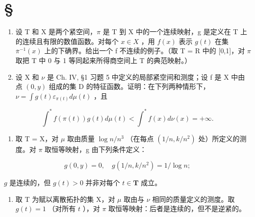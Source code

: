 \section*{\texorpdfstring{\S\CurrentExerciseGroup}{第{\CurrentExerciseGroup}节}}
{}

\begin{enumerate}
\def\labelenumi{\arabic{enumi})}
\item
  设 T 和 X 是两个紧空间，\(\pi\) 是 T 到 X 中的一个连续映射，g 是定义在 T 上的连续且有限的数值函数。对每个 \(x \in X\) ，用 \(f(x)\) 表示 \(g(t)\) 在集 \(\overline{\pi}^{-1}(x)\) 上的下确界。给出一个 f 不连续的例子。（取 T = R 中的 {[}0,1{]}，对 \(\pi\) 取把 T 中 0 与 1 等同起来所得商空间上 T 的典范映射。）
\item
  设 X 和 \(\nu\) 是 Ch. IV, §1 习题 5 中定义的局部紧空间和测度；设 f 是 X 中由点 \((0,y)\) 组成的集 D 的特征函数。证明：在下列两种情形下，\(\nu=\int g(t)\varepsilon_{\pi(t)}d\mu(t)\) ，且
\end{enumerate}

\[
\int^ {*} f (\pi (t)) g (t) d \mu (t) <   \int^ {*} f (x) d \nu (x) = + \infty .
\]

\begin{enumerate}
\def\labelenumi{\alph{enumi})}
\tightlist
\item
  取 T = X，对 \(\mu\) 取由质量 \(\log n/n^{3}\) （在每点 \((1/n, k/n^{2})\) 处）所定义的测度。对 \(\pi\) 取恒等映射，g 由下列条件定义：
\end{enumerate}

\[
g (0, y) = 0, \quad g (1 / n, k / n ^ {2}) = 1 / \log n;
\]

\(g\) 是连续的，但 \(g(t) > 0\) 并非对每个 \(t \in \mathbf{T}\) 成立。

\begin{enumerate}
\def\labelenumi{\alph{enumi})}
\setcounter{enumi}{1}
\tightlist
\item
  取 T 为赋以离散拓扑的集 X，对 \(\mu\) 取由与 \(\nu\) 相同的质量定义的测度。取 \(g(t) = 1\) （对所有 \(t\) ），对 \(\pi\) 取恒等映射：后者是连续的，但不是逆紧的。
\end{enumerate}
\relax{}
\setcounter{exercisegroup}{5}
\edef\CurrentExerciseGroup{\arabic{exercisegroup}}
